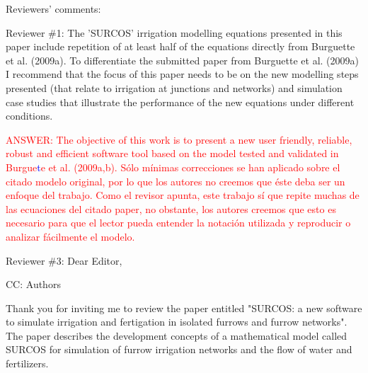 \documentclass[a4paper]{article}
\begin{document}
%
%
%
%
%
%
%

Reviewers' comments:


Reviewer \#1: The 'SURCOS' irrigation modelling equations presented in this paper include repetition of at least half of the equations directly from Burguette et al. (2009a). To differentiate the submitted paper from Burguette et al. (2009a) I recommend that the focus of this paper needs to be on the new modelling steps presented (that relate to irrigation at junctions and networks) and simulation case studies that illustrate the performance of the new equations under different conditions.

\textcolor{red}{ANSWER: The objective of this work is to present a new user 
friendly, reliable, robust and efficient software tool based on the model
tested and validated in Burgue}\textcolor{blue}{t}\textcolor{red}{e et al.
(2009a,b). Sólo mínimas correcciones se han aplicado sobre el citado modelo
original, por lo que los autores no creemos que éste deba ser un enfoque del
trabajo. Como el revisor apunta, este trabajo sí que repite muchas de las
ecuaciones del citado paper, no obstante, los autores creemos que esto es
necesario para que el lector pueda entender la notación utilizada y reproducir o
analizar fácilmente el modelo.}

Reviewer \#3: Dear Editor,

CC: Authors

Thank you for inviting me to review the paper entitled "SURCOS: a new software to simulate irrigation and fertigation in isolated furrows and furrow networks".
The paper describes the development concepts of a mathematical model called SURCOS for simulation of furrow irrigation networks and the flow of water and fertilizers.
\end{document}
